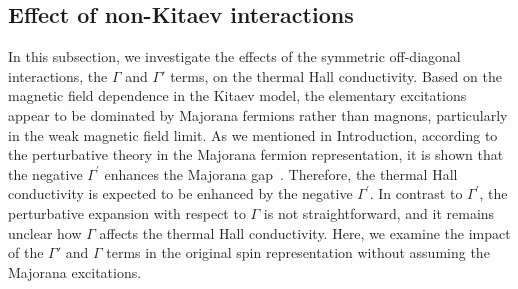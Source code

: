 \documentclass[twocolumn,superscriptaddress,showpacs, longbibliography, aps, prb]{revtex4-2}
\begin{document}
  
\subsection{Effect of non-Kitaev interactions}
\label{sec:Gamma}
In this subsection, we investigate the effects of the symmetric off-diagonal interactions, the $\Gamma$ and $\Gamma'$ terms, on the thermal Hall conductivity.
Based on the magnetic field dependence in the Kitaev model, the elementary excitations appear to be dominated by Majorana fermions rather than magnons, particularly %
in the weak magnetic field limit.
As we %
mentioned in Introduction, %
according to the perturbative theory in the Majorana fermion representation, it is shown that
the negative $\Gamma^{\prime}$ enhances the Majorana gap~\cite{Takikawa_PRB2020}. %
Therefore, %
the thermal Hall conductivity is 
expected to be
enhanced by the negative $\Gamma^{\prime}$.
In contrast to $\Gamma^{\prime}$, the perturbative expansion with respect to $\Gamma$
is not straightforward, and it %
remains unclear how $\Gamma$ affects the thermal Hall conductivity.
Here, we examine the %
impact of the $\Gamma'$ and $\Gamma$ %
terms in the original spin representation without assuming the Majorana excitations.
\end{document}

